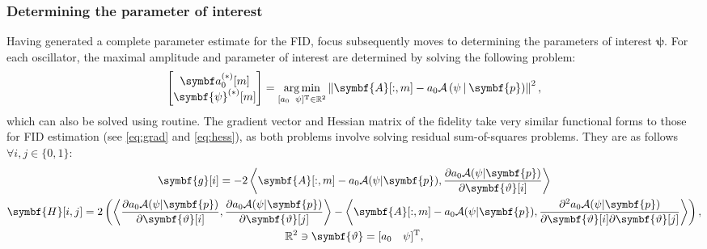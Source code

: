 \subsubsection{Determining the parameter of interest}
Having generated a complete parameter estimate for the \ac{FID}, focus
subsequently moves to determining the parameters of interest $\symbf{\psi}$.
For each oscillator, the maximal amplitude and parameter of
interest are determined by solving the following problem:
\begin{equation}
    \begin{bmatrix}
        \bda_0^{(*)}[m] \\
        \symbf{\psi}^{(*)}[m]
    \end{bmatrix} =
    \argmin_{
        [a_0 \hspace*{5pt} \psi]\T \in \mathbb{R}^2
    }
    \left\lVert
        \symbf{A}[:, m] - a_0 \mathcal{A} \left(\psi \hspace*{2pt} | \hspace*{2pt} \symbf{p}\right)
    \right\rVert^2,
\end{equation}
which can also be solved using  routine. The gradient vector and Hessian
matrix of the fidelity take very similar functional forms to those for \ac{FID}
estimation (see \eqref{eq:grad} and \eqref{eq:hess}), as both problems
involve solving residual sum-of-squares problems.
They are as follows $\forall i, j \in \lbrace 0, 1 \rbrace$:
\begin{subequations}
    \begin{gather}
        \symbf{g}[i] =
            -2 \left \langle
                \symbf{A}[:, m] - a_0 \mathcal{A}(\psi | \symbf{p}),
                \frac{\partial a_0 \mathcal{A} (\psi | \symbf{p})}
                {\partial \symbf{\vartheta}[i]}
            \right \rangle\\
        \symbf{H}[i,j] =
            2 \left( \left \langle
                \frac{\partial a_0 \mathcal{A} (\psi | \symbf{p})}{\partial \symbf{\vartheta}[i]},
                \frac{\partial a_0 \mathcal{A} (\psi | \symbf{p})}{\partial \symbf{\vartheta}[j]}
            \right \rangle -
            \left \langle
                \symbf{A}[:, m] - a_0 \mathcal{A}(\psi | \symbf{p}),
                \frac{\partial^2 a_0 \mathcal{A} (\psi | \symbf{p})}{\partial \symbf{\vartheta}[i]\partial \symbf{\vartheta}[j]}
            \right \rangle \right), \\
            \mathbb{R}^2 \ni \symbf{\vartheta} = [a_0 \hspace*{10pt} \psi]\T,
    \end{gather}
\end{subequations}
